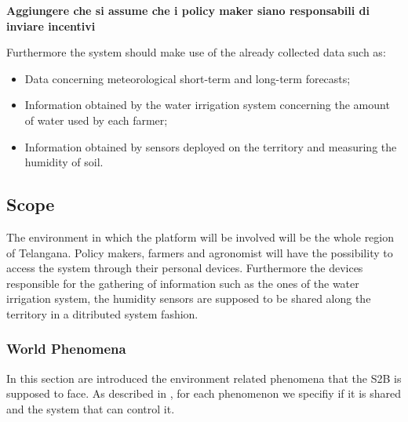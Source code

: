 \textbf{Aggiungere che si assume che i policy maker siano responsabili di inviare incentivi}


Furthermore the system should make use of the already collected data such as:
\begin{itemize}
    \item Data concerning meteorological short-term and long-term forecasts;
    \item Information obtained by the water irrigation system concerning the amount of water used by each farmer;
    \item Information obtained by sensors deployed on the territory and measuring the humidity of soil.
\end{itemize}
\subsection{Scope}
\label{sec:scope}
The environment in which the platform will be involved will be the whole region of Telangana. Policy makers, farmers and agronomist will have the possibility to access the system through their personal devices. Furthermore the devices responsible for the gathering of information such as the ones of the water irrigation system, the humidity sensors are supposed to be shared along the territory in a ditributed system fashion.

\subsubsection{World Phenomena}
In this section are introduced the environment related phenomena that the S2B is supposed to face. As described in \cite{jackson_twatm}, for each phenomenon we specifiy if it is shared and the system that can control it.

